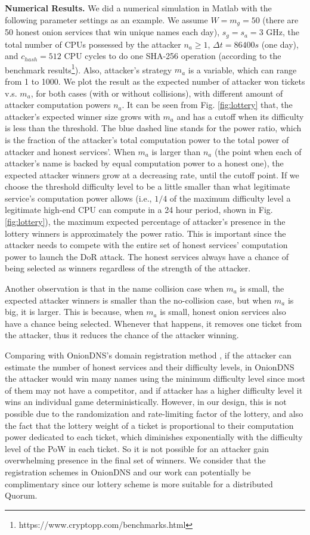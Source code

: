 \documentclass[USenglish,oneside,twocolumn]{article}
\begin{document}
\textbf{Numerical Results.} We did a numerical simulation in Matlab with the following parameter settings as an example. We assume $W=m_g=50$ (there are 50 honest onion services that win unique names each day), $s_g=s_a=3$ GHz, the total number of CPUs possessed by the attacker $n_a\geq 1$, $\Delta t=86400 s$ (one day), and $c_{hash}=512$ CPU cycles to do one SHA-256 operation (according to the benchmark results\footnote{https://www.cryptopp.com/benchmarks.html}). Also,  attacker's strategy $m_a$ is a variable, which can range from 1 to 1000. We plot the result as the expected number of attacker won tickets v.s. $m_a$, for both cases (with or without collisions), with different amount of attacker computation powers $n_a$. It can be seen from Fig. \ref{fig:lottery} that,  the attacker's expected winner size grows with $m_a$ and has a cutoff when its difficulty is less than the threshold. The blue dashed line stands for the power ratio, which is the fraction of the attacker's total computation power to the total power of attacker and honest services'. When  $m_a$ is larger than $n_a$ (the point when each of attacker's name is backed by equal computation power to a honest one), the  expected attacker winners grow at a decreasing rate, until the cutoff point. If we choose the threshold difficulty level to be a little smaller  than what legitimate service's computation power allows  (i.e., $1/4$ of the maximum difficulty level a legitimate high-end CPU can compute in a 24 hour period, shown in Fig. \ref{fig:lottery}), the maximum expected percentage of attacker's presence in the lottery winners  is approximately  the power ratio. This is important since the attacker needs to compete with the entire set of honest services' computation power to launch the DoR attack. The honest services always have a chance of being selected as winners regardless of the strength of the attacker.

Another observation is that in the name collision case when $m_a$ is small, the expected attacker winners is smaller than the no-collision case, but when $m_a$ is big, it is larger. This is because, when $m_a$ is small, honest onion services also have a chance being selected. Whenever that happens, it removes one ticket from the attacker, thus it reduces the chance of the attacker winning. 

Comparing with OnionDNS's domain registration method \cite{scaife2015oniondns}, if the attacker can estimate the number of honest services and their difficulty levels, in OnionDNS the attacker would win many names using the minimum difficulty level since most of them may not have a competitor, and if attacker has a higher difficulty level it wins an individual game deterministically. However, in our design, this is not possible due to the randomization and rate-limiting factor of the lottery, and also the fact that the lottery weight of a ticket is proportional to  their computation power dedicated to each ticket, which diminishes exponentially with the difficulty level of the PoW in each ticket. So it is not possible for an attacker gain overwhelming presence in the final set of winners. We consider that the registration schemes in OnionDNS and our work can potentially be complimentary since our lottery scheme is more suitable for a distributed Quorum.
\end{document}
